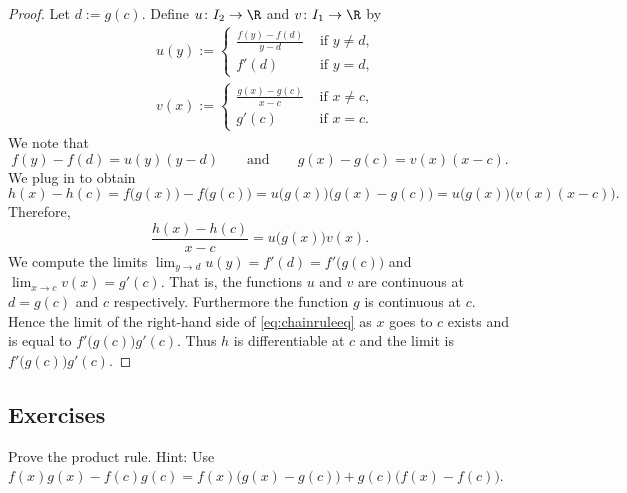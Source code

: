 \documentclass[12pt]{book}
\begin{document}
\begin{proof}
Let $d := g(c)$.
Define
$u \colon I_2 \to \R$ and $v \colon I_1 \to \R$ by
\begin{align*}
& u(y) :=
\begin{cases}
 \frac{f(y) - f(d)}{y-d}  & \text{ if $y \not=d$,} \\
f'(d) & \text{ if $y = d$,}
\end{cases}
\\
& v(x) :=
\begin{cases}
\frac{g(x) - g(c)}{x-c} & \text{ if $x \not=c$,} \\
g'(c) & \text{ if $x = c$.}
\end{cases}
\end{align*}
We note that
\begin{equation*}
f(y)-f(d) = u(y) (y-d)
\qquad \text{and} \qquad
g(x)-g(c) = v(x) (x-c) .
\end{equation*}
We plug in to obtain
\begin{equation*}
h(x)-h(c)
=
f\bigl(g(x)\bigr)-f\bigl(g(c)\bigr)
=
u\bigl( g(x) \bigr) \bigl(g(x)-g(c)\bigr)
=
u\bigl( g(x) \bigr) \bigl(v(x) (x-c)\bigr) .
\end{equation*}
Therefore,
\begin{equation} \label{eq:chainruleeq}
\frac{h(x)-h(c)}{x-c}
=
u\bigl( g(x) \bigr) v(x) .
\end{equation}
We compute the limits $\lim_{y \to d} u(y)
= f'(d) = f'\bigl(g(c)\bigr)$ and
$\lim_{x \to c} v(x) = g'(c)$.
That is, the functions $u$ and $v$
are continuous at $d = g(c)$ and $c$ respectively.
Furthermore the function $g$ is continuous at $c$.
Hence the limit of
the right-hand side of \eqref{eq:chainruleeq}
as $x$ goes to $c$
exists and is equal to $f'\bigl(g(c)\bigr) g'(c)$.
Thus $h$
is differentiable at $c$ and the limit is $f'\bigl(g(c)\bigr)g'(c)$.
\end{proof}

\subsection*{Exercises}

\begin{exercise}
Prove the product rule.
Hint: Use
$f(x) g(x) - f(c) g(c) = f(x)\bigl( g(x) - g(c) \bigr) + g(c) \bigl( f(x) -
f(c) \bigr)$.
\end{exercise}
\end{document}
